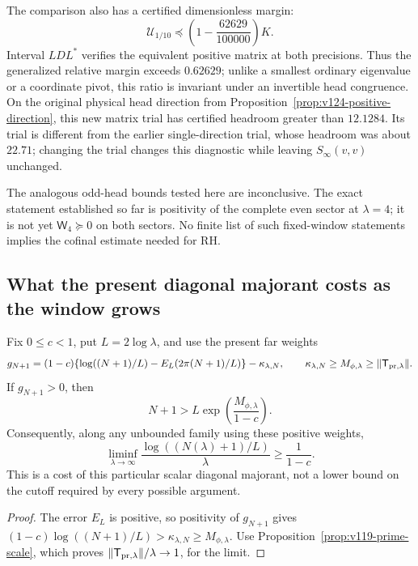The comparison also has a certified dimensionless margin:
\begin{equation}\label{eq:v125-relative-margin}
 \mathcal U_{1/10}\preceq
 \left(1-\frac{62629}{100000}\right)K.
\end{equation}
Interval $LDL^*$ verifies the equivalent positive matrix at both
precisions.  Thus the generalized relative margin exceeds $0.62629$;
unlike a smallest ordinary eigenvalue or a coordinate pivot, this
ratio is invariant under an invertible head congruence.  On the
original physical head direction from
Proposition~\ref{prop:v124-positive-direction}, this new matrix trial
has certified headroom greater than $12.1284$.  Its trial is different
from the earlier single-direction trial, whose headroom was about
$22.71$; changing the trial changes this diagnostic while leaving
$S_\infty(v,v)$ unchanged.

The analogous odd-head bounds tested here are inconclusive.  The
exact statement established so far is positivity of the complete
even sector at $\lambda=4$; it is not yet
$\mathsf W_4\succeq0$ on both sectors.  No finite list of such
fixed-window statements implies the cofinal estimate needed for RH.

\subsection*{What the present diagonal majorant costs as the window grows}

\begin{proposition}
\label{prop:v125-cutoff-cost}
Fix $0\le c<1$, put $L=2\log\lambda$, and use the present far
weights
\[
 g_{N+1}=(1-c)\{\log((N+1)/L)-E_L(2\pi(N+1)/L)\}
               -\kappa_{\lambda,N},
 \qquad \kappa_{\lambda,N}\ge M_{\phi,\lambda}
                    \ge\|\mathsf T_{{\rm pr},\lambda}\|.
\]
If $g_{N+1}>0$, then
\begin{equation}\label{eq:v125-cutoff-cost}
 N+1>L\exp\!\left(\frac{M_{\phi,\lambda}}{1-c}\right).
\end{equation}
Consequently, along any unbounded family using these positive weights,
\[
 \liminf_{\lambda\to\infty}
 \frac{\log((N(\lambda)+1)/L)}{\lambda}\ge\frac1{1-c}.
\]
This is a cost of this particular scalar diagonal majorant, not a
lower bound on the cutoff required by every possible argument.
\end{proposition}
\begin{proof}
The error $E_L$ is positive, so positivity of $g_{N+1}$ gives
$(1-c)\log((N+1)/L)>\kappa_{\lambda,N}\ge M_{\phi,\lambda}$.
Use Proposition~\ref{prop:v119-prime-scale}, which proves
$\|\mathsf T_{{\rm pr},\lambda}\|/\lambda\to1$, for the limit.
\end{proof}


